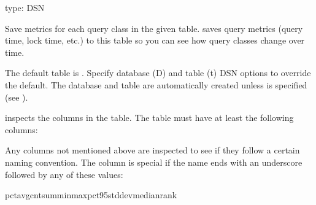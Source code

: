 \documentclass[letterpaper,10pt,english]{sphinxmanual}
\begin{document}
\begin{fulllineitems}
\label{\detokenize{mariadb-query-digest:cmdoption-mariadb-query-digest-history}}
\sphinxAtStartPar
type: DSN

\sphinxAtStartPar
Save metrics for each query class in the given table.   saves
query metrics (query time, lock time, etc.) to this table so you can see how
query classes change over time.

\sphinxAtStartPar
The default table is .  Specify database
(D) and table (t) DSN options to override the default.  The database and
table are automatically created unless 
is specified (see {\hyperref[\detokenize{mariadb-query-digest:cmdoption-mariadb-query-digest-no-create-history-table}]{}}).

\sphinxAtStartPar
{} inspects the columns in the table.  The table must have at
least the following columns:

\begin{sphinxVerbatim}[commandchars=\\\{\}]
   
         
           
\end{sphinxVerbatim}

\sphinxAtStartPar
Any columns not mentioned above are inspected to see if they follow a certain
naming convention.  The column is special if the name ends with an underscore
followed by any of these values:

\begin{sphinxVerbatim}[commandchars=\\\{\}]
pctavgcntsumminmaxpct\PYGZus{}95stddevmedianrank
\end{sphinxVerbatim}


\end{fulllineitems}
\end{document}
